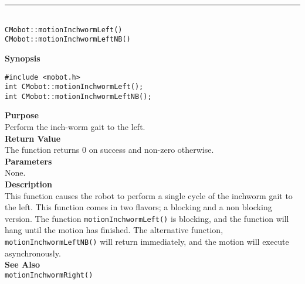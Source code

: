 \noindent
\vspace{5pt}
\rule{4.5in}{0.015in}\\
\noindent
{\LARGE \texttt{CMobot::motionInchwormLeft()}}\\
{\LARGE \texttt{CMobot::motionInchwormLeftNB()}}\\
{}

\noindent
{\bf Synopsis}
\vspace{-8pt}
\begin{verbatim}
#include <mobot.h>
int CMobot::motionInchwormLeft();
int CMobot::motionInchwormLeftNB();
\end{verbatim}

\noindent
{\bf Purpose}\\
Perform the inch-worm gait to the left.\\

\noindent
{\bf Return Value}\\
The function returns 0 on success and non-zero otherwise.\\

\noindent
{\bf Parameters}\\
None.\\

\noindent
{\bf Description}\\
This function causes the robot to perform a single cycle of the inchworm gait
to the left. This function comes in two flavors; a blocking and a non blocking
version. The function \texttt{motionInchwormLeft()} is blocking, and the function
will hang until the motion has finished. The alternative function, \texttt{motionInchwormLeftNB()} 
will return immediately, and the motion will execute asynchronously. \\

\noindent
{\bf See Also}\\
\texttt{motionInchwormRight()}

